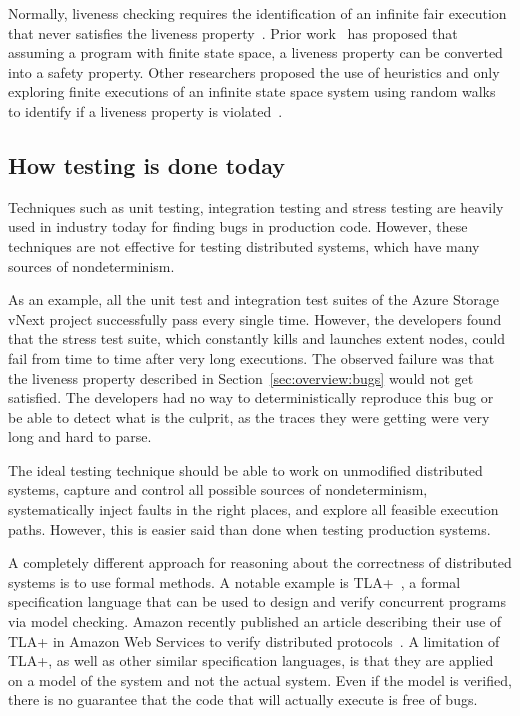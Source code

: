 Normally, liveness checking requires the identification of an infinite fair execution that never satisfies the liveness property~\cite{schuppan2004efficient, musuvathi2008fair}. Prior work~\cite{schuppan2004efficient} has proposed that assuming a program with finite state space, a liveness property can be converted into a safety property. Other researchers proposed the use of heuristics and only exploring finite executions of an infinite state space system using random walks to identify if a liveness property is violated~\cite{killian2007life}.

\subsection{How testing is done today}
\label{sec:overview:testing}

Techniques such as unit testing, integration testing and stress testing are heavily used in industry today for finding bugs in production code. However, these techniques are not effective for testing distributed systems, which have many sources of nondeterminism.

As an example, all the unit test and integration test suites of the Azure Storage vNext project successfully pass every single time. However, the developers found that the stress test suite, which constantly kills and launches extent nodes, could fail from time to time after very long executions. The observed failure was that the liveness property described in Section~\ref{sec:overview:bugs} would not get satisfied. The developers had no way to deterministically reproduce this bug or be able to detect what is the culprit, as the traces they were getting were very long and hard to parse.

The ideal testing technique should be able to work on unmodified distributed systems, capture and control all possible sources of nondeterminism, systematically inject faults in the right places, and explore all feasible execution paths. However, this is easier said than done when testing production systems.

A completely different approach for reasoning about the correctness of distributed systems is to use formal methods.  A notable example is TLA+~\cite{lamport1994temporal}, a formal specification language that can be used to design and verify concurrent programs via model checking. Amazon recently published an article describing their use of TLA+ in Amazon Web Services to verify distributed protocols~\cite{newcombe2015aws}. A limitation of TLA+, as well as other similar specification languages, is that they are applied on a model of the system and not the actual system. Even if the model is verified, there is no guarantee that the code that will actually execute is free of bugs.

